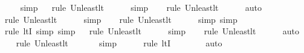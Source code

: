 \begin{isabellebody}
\ \ \isamarkupfalse%
\ simp\isanewline
\ \ \isamarkupfalse%
{\isacharparenleft}{\kern0pt}rule\ Un{\isacharunderscore}{\kern0pt}least{\isacharunderscore}{\kern0pt}lt{\isacharparenright}{\kern0pt}{\isacharplus}{\kern0pt}\isanewline
\ \ \ \ \isamarkupfalse%
\ simp\isanewline
\ \ \ \isamarkupfalse%
{\isacharparenleft}{\kern0pt}rule\ Un{\isacharunderscore}{\kern0pt}least{\isacharunderscore}{\kern0pt}lt{\isacharparenright}{\kern0pt}{\isacharplus}{\kern0pt}\isanewline
\ \ \ \ \isamarkupfalse%
\ auto{\isacharbrackleft}{\kern0pt}{}{\isacharbrackright}{\kern0pt}\isanewline
\ \ \isamarkupfalse%
{\isacharparenleft}{\kern0pt}rule\ Un{\isacharunderscore}{\kern0pt}least{\isacharunderscore}{\kern0pt}lt{\isacharparenright}{\kern0pt}{\isacharplus}{\kern0pt}\isanewline
\ \ \ \ \isamarkupfalse%
\ simp\isanewline
\ \ \ \isamarkupfalse%
{\isacharparenleft}{\kern0pt}rule\ Un{\isacharunderscore}{\kern0pt}least{\isacharunderscore}{\kern0pt}lt{\isacharparenright}{\kern0pt}{\isacharplus}{\kern0pt}\isanewline
\ \ \ \ \isamarkupfalse%
\ {\isacharparenleft}{\kern0pt}simp{\isacharcomma}{\kern0pt}\ simp{\isacharparenright}{\kern0pt}\isanewline
\ \ \ \isamarkupfalse%
{\isacharparenleft}{\kern0pt}rule\ ltI{\isacharcomma}{\kern0pt}\ simp{\isacharcomma}{\kern0pt}\ simp{\isacharparenright}{\kern0pt}\isanewline
\ \ \isamarkupfalse%
{\isacharparenleft}{\kern0pt}rule\ Un{\isacharunderscore}{\kern0pt}least{\isacharunderscore}{\kern0pt}lt{\isacharparenright}{\kern0pt}{\isacharplus}{\kern0pt}\isanewline
\ \ \ \ \isamarkupfalse%
\ simp\isanewline
\ \ \ \isamarkupfalse%
{\isacharparenleft}{\kern0pt}rule\ Un{\isacharunderscore}{\kern0pt}least{\isacharunderscore}{\kern0pt}lt{\isacharparenright}{\kern0pt}{\isacharplus}{\kern0pt}\isanewline
\ \ \ \ \isamarkupfalse%
\ auto{\isacharbrackleft}{\kern0pt}{}{\isacharbrackright}{\kern0pt}\isanewline
\ \ \isamarkupfalse%
{\isacharparenleft}{\kern0pt}rule\ Un{\isacharunderscore}{\kern0pt}least{\isacharunderscore}{\kern0pt}lt{\isacharparenright}{\kern0pt}{\isacharplus}{\kern0pt}\isanewline
\ \ \ \ \ \isamarkupfalse%
\ simp\isanewline
\ \ \ \ \ \isamarkupfalse%
{\isacharparenleft}{\kern0pt}rule\ ltI{\isacharparenright}{\kern0pt}\isanewline
\ \ \ \ \ \ \isamarkupfalse%
\ auto{\isacharbrackleft}{\kern0pt}{}{\isacharbrackright}{\kern0pt}\isanewline

\end{isabellebody}
